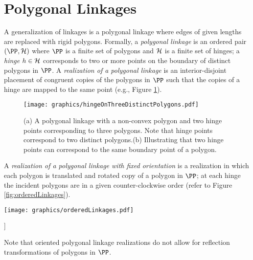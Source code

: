 \section{Polygonal Linkages}\label{sec:hinge}
A generalization of linkages is a polygonal linkage where edges of given lengths are replaced with rigid polygons.
Formally, a \textit{polygonal linkage} is an ordered pair $\left(\PP,\HH \right)$ where $\PP$ is a finite set of polygons and ${\mathcal{H}}$ is a finite set of hinges; a \textit{hinge} $h\in {\mathcal{H}}$ corresponds to two or more points on the boundary of distinct polygons in $\PP$.  
A \emph{realization of a polygonal linkage} is an interior-disjoint placement of congruent copies of the polygons in $\PP$ such that the copies of a hinge are mapped to the same point (e.g., Figure \ref{fig:linkage-1}).  
\begin{figure}[!htbp]
\begin{center}
\texttt{[image: graphics/hingeOnThreeDistinctPolygons.pdf]}
\end{center} 
\caption{(a) A polygonal linkage with a non-convex polygon and two hinge points corresponding to 
three polygons.  Note that hinge points correspond to two distinct polygons.(b) Illustrating that 
two hinge points can correspond to the same boundary point of a polygon.}
\label{fig:linkage-1}
\end{figure}
A \textit{realization of a polygonal linkage with fixed orientation} is a realization in which each polygon is translated and rotated copy of a polygon in $\PP$; at each hinge the incident polygons are in a given counter-clockwise order (refer to Figure \ref{fig:orderedLinkages}).

\begin{minipage}{\linewidth}
\begin{center}
\texttt{[image: graphics/orderedLinkages.pdf]}
\label{fig:orderedLinkages}
\end{center}]
\end{minipage}

Note that oriented polygonal linkage realizations do not allow for reflection transformations of polygons in $\PP$.

